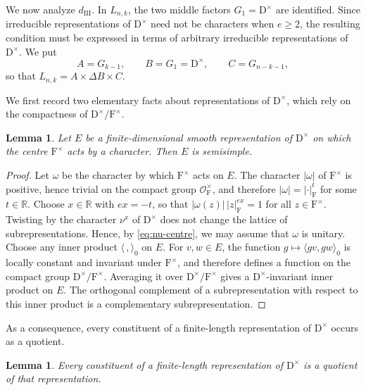 \documentclass[11pt]{amsart}
\numberwithin{equation}{section}
\theoremstyle{plain}
\newtheorem{lemma}[theorem]{Lemma}
\theoremstyle{definition}
\theoremstyle{remark}
\newcommand{\R}{\mathbb{R}}
\newcommand{\dIII}{d_{\mathrm{III}}}
\begin{document}
We now analyze $\dIII$. In $L_{n,k}$, the two middle factors $G_1=\mathrm{D}^\times$ are identified. Since irreducible representations of $\mathrm{D}^\times$ need not be characters when $e\ge2$, the resulting condition must be expressed in terms of arbitrary irreducible representations of $\mathrm{D}^\times$. We put
$$
A=G_{k-1},\qquad B=G_1=\mathrm{D}^\times,\qquad C=G_{n-k-1},
$$
so that $L_{n,k}=A\times\Delta B\times C$.

We first record two elementary facts about representations of $\mathrm{D}^\times$, which rely on the compactness of $\mathrm{D}^\times/\mathrm{F}^\times$.

\begin{lemma}\label{lem:Dx-semisimple}
	Let $E$ be a finite-dimensional smooth representation of $\mathrm{D}^\times$ on which the centre $\mathrm{F}^\times$ acts by a character. Then $E$ is semisimple.
\end{lemma}

\begin{proof}
	Let $\omega$ be the character by which $\mathrm{F}^\times$ acts on $E$. The character $|\omega|$ of $\mathrm{F}^\times$ is positive, hence trivial on the compact group $\mathcal O_{\mathrm{F}}^\times$, and therefore $|\omega|=|\cdot|_{\mathrm{F}}^{t}$ for some $t\in\R$. Choose $x\in\R$ with $ex=-t$, so that $|\omega(z)|\,|z|_{\mathrm{F}}^{ex}=1$ for all $z\in \mathrm{F}^\times$. Twisting by the character $\nu^x$ of $\mathrm{D}^\times$ does not change the lattice of subrepresentations. Hence, by \eqref{eq:nu-centre}, we may assume that $\omega$ is unitary. Choose any inner product $\langle\,,\rangle_0$ on $E$. For $v,w\in E$, the function $g\mapsto\langle gv,gw\rangle_0$ is locally constant and invariant under $\mathrm{F}^\times$, and therefore defines a function on the compact group $\mathrm{D}^\times/\mathrm{F}^\times$. Averaging it over $\mathrm{D}^\times/\mathrm{F}^\times$ gives a $\mathrm{D}^\times$-invariant inner product on $E$. The orthogonal complement of a subrepresentation with respect to this inner product is a complementary subrepresentation.
\end{proof}

As a consequence, every constituent of a finite-length representation of $\mathrm{D}^\times$ occurs as a quotient.

\begin{lemma}\label{lem:Dx-quotient}
	Every constituent of a finite-length representation of $\mathrm{D}^\times$ is a quotient of that representation.
\end{lemma}
\end{document}
